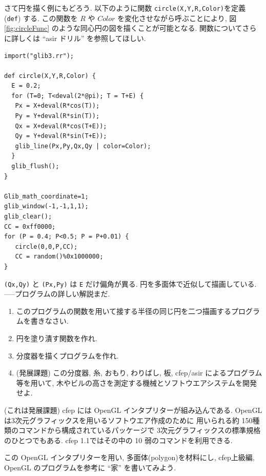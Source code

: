 \documentclass{jbook}
\begin{document}
さて円を描く例にもどろう.
以下のように関数 {\tt circle(X,Y,R,Color)}を定義 ({\tt def}) する.
この関数を $R$ や $Color$ を変化させながら呼ぶことにより,
図\ref{fig:circleFunc} のような同心円の図を描くことが可能となる.
関数についてさらに詳しくは ``asir ドリル'' を参照してほしい.

\begin{screen}
\begin{verbatim}
import("glib3.rr"); 

def circle(X,Y,R,Color) {
  E = 0.2;  
  for (T=0; T<deval(2*@pi); T = T+E) {
   Px = X+deval(R*cos(T));
   Py = Y+deval(R*sin(T));
   Qx = X+deval(R*cos(T+E));
   Qy = Y+deval(R*sin(T+E));
   glib_line(Px,Py,Qx,Qy | color=Color);
  }
  glib_flush();
}

Glib_math_coordinate=1;
glib_window(-1,-1,1,1);
glib_clear();
CC = 0xff0000;
for (P = 0.4; P<0.5; P = P+0.01) {
   circle(0,0,P,CC);
   CC = random()%0x1000000;
}
\end{verbatim}
\end{screen}
{\tt (Qx,Qy)} と {\tt (Px,Py)} は
{\tt E} だけ偏角が異る.
円を多面体で近似して描画している. \\
-----プログラムの詳しい解説まだ.

\begin{problem} \rm
\begin{enumerate}
\item このプログラムの関数を用いて接する半径の同じ円を二つ描画するプログラムを書きなさい.
\item 円を塗り潰す関数を作れ.
\item 分度器を描くプログラムを作れ.
\item (発展課題) この分度器, 糸, おもり, わりばし, 板, cfep/asir によるプログラム等を用いて,
木やビルの高さを測定する機械とソフトウエアシステムを開発せよ.
\end{enumerate}
\end{problem}

\begin{problem} \rm
(これは発展課題)    
cfep には OpenGL インタプリターが組み込んである.
OpenGL は3次元グラフィックスを用いるソフトウエア作成のために
用いられる約 150種類のコマンドから構成されているパッケージで
3次元グラフィックスの標準規格のひとつでもある.
cfep 1.1ではその中の 10 弱のコマンドを利用できる.

この OpenGL インタプリターを用い,
多面体(polygon)を材料にし,
cfep上級編, OpenGL のプログラムを参考に
``家'' を書いてみよう. 
\end{problem}
\end{document}
